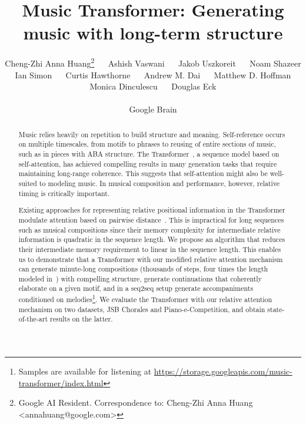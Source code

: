 \documentclass{article} \usepackage{iclr2019_conference,times}
\title{Music Transformer: \newline Generating music with long-term structure}
\author{Cheng-Zhi Anna Huang\thanks{Google AI Resident. Correspondence to: Cheng-Zhi Anna Huang <annahuang@google.com>} ~~
Ashish Vaswani ~~
Jakob Uszkoreit ~~
Noam Shazeer\\
\And
Ian Simon ~~
Curtis Hawthorne ~~
Andrew M. Dai ~~
Matthew D. Hoffman\\
\AND
Monica Dinculescu ~~
Douglas Eck\\\rule{0pt}{10pt}Google Brain \\
}
\newcommand{\CHECK}[1]{\textbf{\textcolor{red}{#1}}}
\begin{document}
\maketitle

\begin{abstract}
Music relies heavily on repetition to build structure and meaning.  Self-reference occurs on multiple timescales, from motifs to phrases to reusing of entire sections of music, such as in pieces with ABA structure.  The Transformer~\citep{vaswani2017attention}, a sequence model based on self-attention, has achieved compelling results in many generation tasks that require maintaining long-range coherence. This suggests that self-attention might also be well-suited to modeling music. In musical composition and performance, however, relative timing is critically important.
\iffalse
\CHECK{Existing approaches for representing relative positional information use pairwise distance to modulate attention~\citep{shaw2018self}.  Their approach for long sequences such as musical compositions since their memory complexity grow super quadratically with sequence length.
We propose an algorithm that reduces the intermediate memory requirements of the relative positional information to linear in the sequence length, allowing the overall memory to be only quadratic.}
\fi
Existing approaches for representing relative positional information in the Transformer modulate attention based on pairwise distance~\citep{shaw2018self}.  This is impractical for long sequences such as musical compositions since their memory complexity for intermediate relative information is quadratic in the sequence length.
We propose an algorithm that reduces their intermediate memory requirement to linear in the sequence length. 
This enables us to demonstrate that a Transformer with our modified relative attention mechanism can generate minute-long compositions (thousands of steps, four times the length modeled in~\citet{oore2018time}) with compelling structure, generate continuations that coherently elaborate on a given motif, and in a seq2seq setup generate accompaniments conditioned on melodies\footnote{Samples are available for listening at \newline \url{https://storage.googleapis.com/music-transformer/index.html}}. We evaluate the Transformer with our relative attention mechanism on two datasets, JSB Chorales and Piano-e-Competition, and obtain state-of-the-art results on the latter.


\end{abstract}
\end{document}
